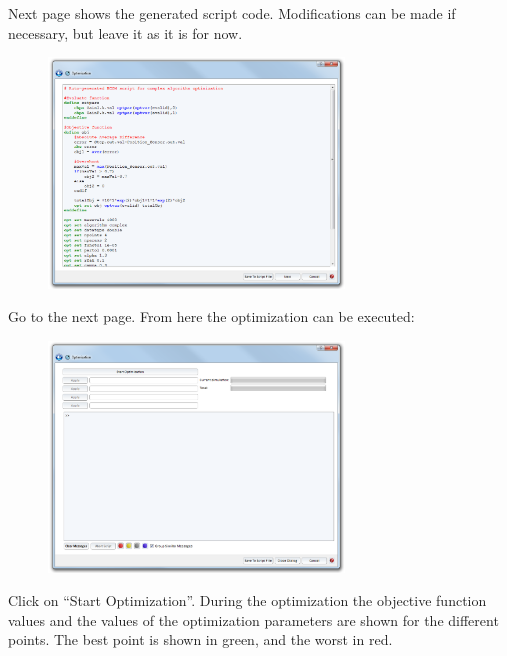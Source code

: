 \documentclass[a4paper,pdftex]{article}
\begin{document}
\begin{tutenumerate}
Next page shows the generated script code. Modifications can be made if necessary, but leave it as it is for now.

\FloatBarrier
\begin{figure}[htb]
\center
\includegraphics[width=0.7\textwidth]{gfx/optimization/screenshot-opt4.png}
\end{figure}
\FloatBarrier

\newpage
Go to the next page. From here the optimization can be executed:

\FloatBarrier
\begin{figure}[htb]
\center
\includegraphics[width=0.7\textwidth]{gfx/optimization/screenshot-opt5a.png}
\end{figure}
\FloatBarrier

Click on \enquote{Start Optimization}. During the optimization the objective function values and the values of the optimization parameters are shown for the different points. The best point is shown in green, and the worst in red.


\end{tutenumerate}
\end{document}
